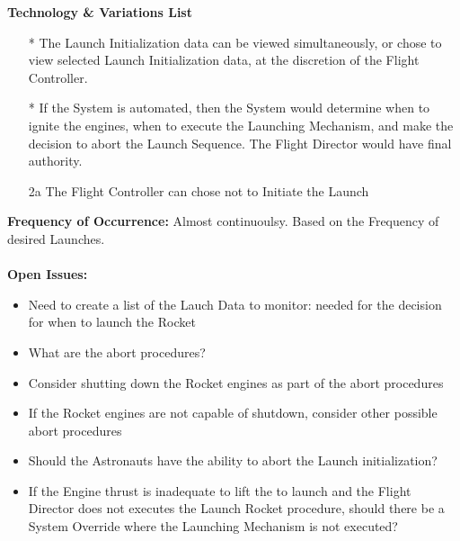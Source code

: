 \documentclass[letterpaper]{article}
\begin{document}
\textbf{Technology \& Variations List}
\begin{itemize}
\item[*] The Launch Initialization data can be viewed simultaneously,
or chose to view selected Launch Initialization data, at the discretion
of the Flight Controller.
\item[*]  If the System is automated, then the System would determine
when to ignite the engines, when  to execute the Launching
Mechanism, and make the decision to abort the Launch Sequence.  The
Flight Director would have final authority.
\item[2a]The Flight Controller can chose not to Initiate the Launch
\end{itemize}
\textbf{Frequency of Occurrence:  }Almost continuoulsy.  Based on the
Frequency of desired Launches.\\\\
\textbf{Open Issues:  }
\begin{itemize}
\item Need to create a list of the Lauch Data to monitor:  needed for
the decision for when to launch the Rocket
\item What are the abort procedures?
\item Consider shutting down the Rocket engines as part of the abort
procedures
\item If the Rocket engines are not capable of shutdown, consider
other possible abort procedures
\item Should the Astronauts have the ability to abort the Launch
initialization?
\item If the Engine thrust is inadequate to lift the to launch and
the Flight Director does not executes the Launch Rocket procedure,
should there be a System Override where the Launching Mechanism is not
executed?
\end{itemize}
\end{document}
